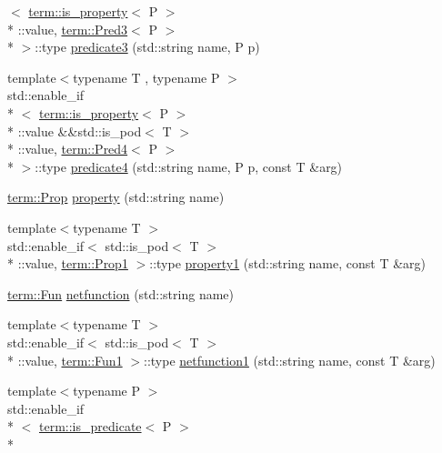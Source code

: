 \begin{DoxyCompactItemize}
$<$ \hyperlink{structpfq__lang_1_1term_1_1is__property}{term\+::is\+\_\+property}$<$ P $>$\\*
\+::value, \hyperlink{structpfq__lang_1_1term_1_1Pred3}{term\+::\+Pred3}$<$ P $>$\\*
 $>$\+::type \hyperlink{namespacepfq__lang_a863e349ba4942bf8a01b61d91859164a}{predicate3} (std\+::string name, P p)
\item 
{\footnotesize template$<$typename T , typename P $>$ }\\std\+::enable\+\_\+if\\*
$<$ \hyperlink{structpfq__lang_1_1term_1_1is__property}{term\+::is\+\_\+property}$<$ P $>$\\*
\+::value \&\&std\+::is\+\_\+pod$<$ T $>$\\*
\+::value, \hyperlink{structpfq__lang_1_1term_1_1Pred4}{term\+::\+Pred4}$<$ P $>$\\*
 $>$\+::type \hyperlink{namespacepfq__lang_a1a9064340f4197e3dd4109a849a224dc}{predicate4} (std\+::string name, P p, const T \&arg)
\item 
\hyperlink{structpfq__lang_1_1term_1_1Prop}{term\+::\+Prop} \hyperlink{namespacepfq__lang_ad70b40071ed0fd32c05ab8e82bbfec61}{property} (std\+::string name)
\item 
{\footnotesize template$<$typename T $>$ }\\std\+::enable\+\_\+if$<$ std\+::is\+\_\+pod$<$ T $>$\\*
\+::value, \hyperlink{structpfq__lang_1_1term_1_1Prop1}{term\+::\+Prop1} $>$\+::type \hyperlink{namespacepfq__lang_a3a4768b9f4e03b86943d332254cca27e}{property1} (std\+::string name, const T \&arg)
\item 
\hyperlink{structpfq__lang_1_1term_1_1Fun}{term\+::\+Fun} \hyperlink{namespacepfq__lang_a9f546a4602872df5ca74050ecb68a6b3}{netfunction} (std\+::string name)
\item 
{\footnotesize template$<$typename T $>$ }\\std\+::enable\+\_\+if$<$ std\+::is\+\_\+pod$<$ T $>$\\*
\+::value, \hyperlink{structpfq__lang_1_1term_1_1Fun1}{term\+::\+Fun1} $>$\+::type \hyperlink{namespacepfq__lang_af215f25fa7ebd61fdc90cf0ef78a3164}{netfunction1} (std\+::string name, const T \&arg)
\item 
{\footnotesize template$<$typename P $>$ }\\std\+::enable\+\_\+if\\*
$<$ \hyperlink{structpfq__lang_1_1term_1_1is__predicate}{term\+::is\+\_\+predicate}$<$ P $>$\\*

\end{DoxyCompactItemize}
